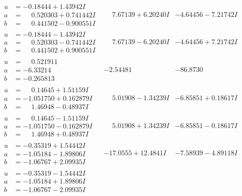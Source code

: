 \documentclass[1p]{elsarticle_modified}
\theoremstyle{definition}
\begin{document}
$$\begin{array}{c|c|c}
\begin{aligned}
u &= -0.18444 + 1.43942 I \\
a &= \phantom{-}0.520303 + 0.741442 I \\
b &= \phantom{-}0.441502 - 0.900551 I\end{aligned}
 & \phantom{-}7.67139 + 6.20240 I & -4.64456 - 7.21742 I \\ \hline\begin{aligned}
u &= -0.18444 - 1.43942 I \\
a &= \phantom{-}0.520303 - 0.741442 I \\
b &= \phantom{-}0.441502 + 0.900551 I\end{aligned}
 & \phantom{-}7.67139 - 6.20240 I & -4.64456 + 7.21742 I \\ \hline\begin{aligned}
u &= \phantom{-}0.521911\phantom{ +0.000000I} \\
a &= -6.33214\phantom{ +0.000000I} \\
b &= -0.265813\phantom{ +0.000000I}\end{aligned}
 & -2.54481\phantom{ +0.000000I} & -86.8730\phantom{ +0.000000I} \\ \hline\begin{aligned}
u &= \phantom{-}0.14645 + 1.51159 I \\
a &= -1.051750 + 0.162879 I \\
b &= \phantom{-}1.46948 - 0.48937 I\end{aligned}
 & \phantom{-}5.01908 - 1.34239 I & -6.85851 + 0.18617 I \\ \hline\begin{aligned}
u &= \phantom{-}0.14645 - 1.51159 I \\
a &= -1.051750 - 0.162879 I \\
b &= \phantom{-}1.46948 + 0.48937 I\end{aligned}
 & \phantom{-}5.01908 + 1.34239 I & -6.85851 - 0.18617 I \\ \hline\begin{aligned}
u &= -0.35319 + 1.54442 I \\
a &= -1.05184 - 1.89806 I \\
b &= -1.06767 + 2.09935 I\end{aligned}
 & -17.0555 + 12.4841 I & -7.58939 - 4.89118 I \\ \hline\begin{aligned}
u &= -0.35319 - 1.54442 I \\
a &= -1.05184 + 1.89806 I \\
b &= -1.06767 - 2.09935 I\end{aligned}

\end{array}$$
\end{document}

